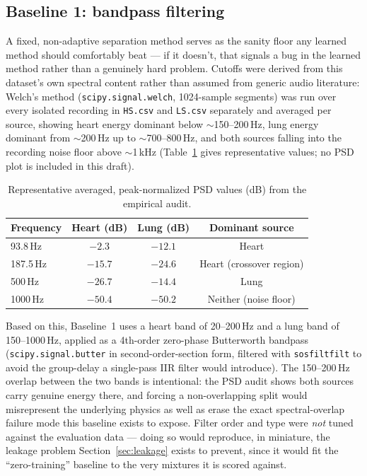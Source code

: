 \documentclass[11pt]{article}
\begin{document}
\subsection{Baseline 1: bandpass filtering}
\label{sec:baseline1}

A fixed, non-adaptive separation method serves as the sanity floor any
learned method should comfortably beat --- if it doesn't, that signals a bug
in the learned method rather than a genuinely hard problem. Cutoffs were
derived from this dataset's own spectral content rather than assumed from
generic audio literature: Welch's method (\texttt{scipy.signal.welch},
1024-sample segments) was run over every isolated recording in
\texttt{HS.csv} and \texttt{LS.csv} separately and averaged per source,
showing heart energy dominant below $\sim$150--200\,Hz, lung energy dominant
from $\sim$200\,Hz up to $\sim$700--800\,Hz, and both sources falling into
the recording noise floor above $\sim$1\,kHz (Table~\ref{tab:psd} gives
representative values; no PSD plot is included in this draft).

\begin{table}[H]
\centering
\caption{Representative averaged, peak-normalized PSD values (dB) from the empirical audit.}
\label{tab:psd}
\begin{tabular}{@{}lccc@{}}
\toprule
Frequency & Heart (dB) & Lung (dB) & Dominant source \\
\midrule
93.8\,Hz  & $-2.3$  & $-12.1$ & Heart \\
187.5\,Hz & $-15.7$ & $-24.6$ & Heart (crossover region) \\
500\,Hz   & $-26.7$ & $-14.4$ & Lung \\
1000\,Hz  & $-50.4$ & $-50.2$ & Neither (noise floor) \\
\bottomrule
\end{tabular}
\end{table}

Based on this, Baseline~1 uses a heart band of 20--200\,Hz and a lung band
of 150--1000\,Hz, applied as a 4th-order zero-phase Butterworth bandpass
(\texttt{scipy.signal.butter} in second-order-section form, filtered with
\texttt{sosfiltfilt} to avoid the group-delay a single-pass IIR filter would
introduce). The 150--200\,Hz overlap between the two bands is intentional:
the PSD audit shows both sources carry genuine energy there, and forcing a
non-overlapping split would misrepresent the underlying physics as well as
erase the exact spectral-overlap failure mode this baseline exists to
expose. Filter order and type were \emph{not} tuned against the evaluation
data --- doing so would reproduce, in miniature, the leakage problem
Section~\ref{sec:leakage} exists to prevent, since it would fit the
``zero-training'' baseline to the very mixtures it is scored against.
\end{document}
